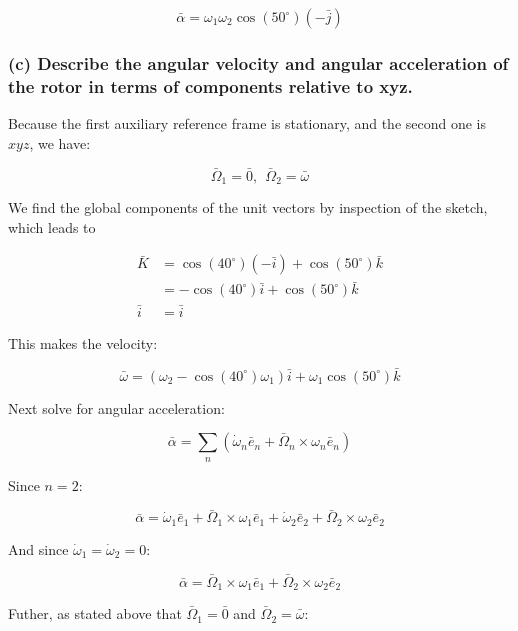 \documentclass[12pt, letterpaper]{../assignment}
\begin{document}
\begin{answer}
    $$ \bar{\alpha} = \omega_1 \omega_2 \cos(50^\circ) \left(-\bar{j}\right) $$
\end{answer}

\subsubsection*{(c) Describe the angular velocity and angular acceleration of the rotor in terms of components relative to xyz.}

Because the first auxiliary reference frame is stationary, and the second one is $xyz$, we have:

$$ \bar{\Omega}_1 = \bar{0}, \ \ \bar{\Omega}_2 = \bar{\omega} $$

We find the global components of the unit vectors by inspection of the sketch, which leads to

\begin{equation*}
\begin{aligned}
\bar{K} &= \cos(40^\circ)(-\bar{i}) + \cos(50^\circ)\bar{k} \\
        &= -\cos(40^\circ)\bar{i} + \cos(50^\circ)\bar{k}  \\
\bar{i} &= \bar{i} 
\end{aligned}
\end{equation*}

This makes the velocity:

\begin{answer}
$$ \bar{\omega} = \left(\omega_2-\cos(40^\circ)\omega_1\right) \bar{i} + \omega_1\cos(50^\circ)\bar{k} $$
\end{answer}

Next solve for angular acceleration:

$$ \bar{\alpha} =
\sum_n \left( \dot{\omega}_n \bar{e}_n + \bar{\Omega}_n \times \omega_n \bar{e}_n \right) $$

Since $n=2$:

$$ \bar{\alpha} =
\dot{\omega}_1 \bar{e}_1 + \bar{\Omega}_1 \times \omega_1 \bar{e}_1 +
\dot{\omega}_2 \bar{e}_2 + \bar{\Omega}_2 \times \omega_2 \bar{e}_2 $$

And since $\dot{\omega}_1 = \dot{\omega}_2 = 0$:

$$ \bar{\alpha} =
\bar{\Omega}_1 \times \omega_1 \bar{e}_1 +
\bar{\Omega}_2 \times \omega_2 \bar{e}_2 $$

Futher, as stated above that $\bar{\Omega}_1 = \bar{0}$ and $\bar{\Omega}_2 = \bar{\omega}$:
\end{document}
